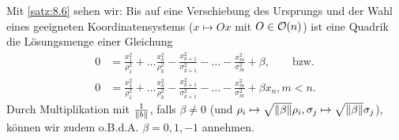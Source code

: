\begin{bemerkung}
	\label{bem:8.8}
	Mit \autoref{satz:8.6} sehen wir:
	Bis auf eine Verschiebung des Ursprungs und der Wahl eines geeigneten Koordinatensystems ($x \mapsto Ox$ mit $O \in \mathcal{O}(n)$) ist eine Quadrik die Lösungsmenge einer Gleichung
	\begin{align*}
		0 &= \frac{x_1^2}{\rho_1^2} + \dots \frac{x_k^2}{\rho_k^2} - \frac{x_{k+1}^2}{\sigma_{k+1}^2} - \dots - \frac{x_m^2}{\sigma_m^2} + \beta, \qquad \text{bzw.} \\
		0 &= \frac{x_1^2}{\rho_1^2} + \dots \frac{x_k^2}{\rho_k^2} - \frac{x_{k+1}^2}{\sigma_{k+1}^2} - \dots - \frac{x_m^2}{\sigma_m^2} + \beta x_n, m < n.
	\end{align*}
	Durch Multiplikation mit $\frac{1}{\left\lVert b\right\rVert}$, falls $\beta \neq 0$ (und $\rho_i \mapsto \sqrt{\left\lVert\beta\right\rVert} \rho_i, \sigma_j \mapsto \sqrt{\left\lVert\beta\right\rVert} \sigma_j$), können wir zudem o.B.d.A. $\beta = 0, 1, -1$ annehmen.
\end{bemerkung}

\newpage
